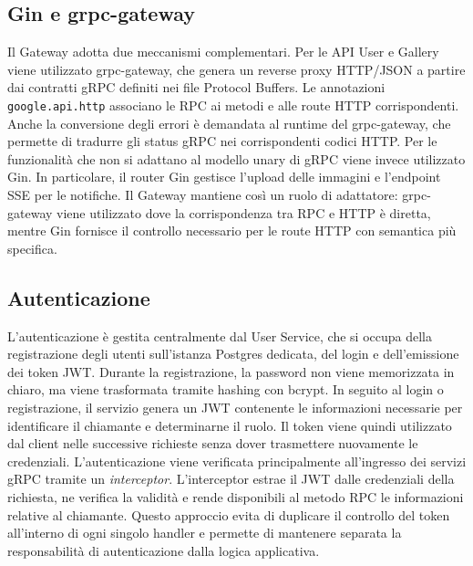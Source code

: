 \documentclass[conference]{IEEEtran}
\begin{document}
\subsection{Gin e grpc-gateway}
Il Gateway adotta due meccanismi complementari. Per le API User e Gallery viene utilizzato grpc-gateway, che genera un reverse proxy HTTP/JSON a partire dai contratti gRPC definiti nei file Protocol Buffers. Le annotazioni \texttt{google.api.http} associano le RPC ai metodi e alle route HTTP corrispondenti. Anche la conversione degli errori è demandata al runtime del grpc-gateway, che permette di tradurre gli status gRPC nei corrispondenti codici HTTP\cite{b3,b11}. Per le funzionalità che non si adattano al modello unary di gRPC viene invece utilizzato Gin. In particolare, il router Gin gestisce l'upload delle immagini e l'endpoint SSE per le notifiche. Il Gateway mantiene così un ruolo di adattatore: grpc-gateway viene utilizzato dove la corrispondenza tra RPC e HTTP è diretta, mentre Gin fornisce il controllo necessario per le route HTTP con semantica più specifica\cite{b4,b11}.
\subsection{Autenticazione}
L'autenticazione è gestita centralmente dal User Service, che si occupa della registrazione degli utenti sull'istanza Postgres dedicata, del login e dell'emissione dei token JWT. Durante la registrazione, la password non viene memorizzata in chiaro, ma viene trasformata tramite hashing con bcrypt. In seguito al login o registrazione, il servizio genera un JWT contenente le informazioni necessarie per identificare il chiamante e determinarne il ruolo. Il token viene quindi utilizzato dal client nelle successive richieste senza dover trasmettere nuovamente le credenziali. L'autenticazione viene verificata principalmente all'ingresso dei servizi gRPC tramite un \textit{interceptor}. L'interceptor estrae il JWT dalle credenziali della richiesta, ne verifica la validità e rende disponibili al metodo RPC le informazioni relative al chiamante. Questo approccio evita di duplicare il controllo del token all'interno di ogni singolo handler e permette di mantenere separata la responsabilità di autenticazione dalla logica applicativa.
\end{document}
